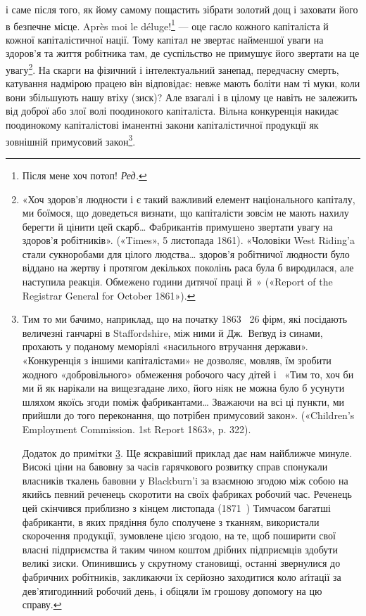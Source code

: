 і саме після того, як йому самому пощастить зібрати золотий
дощ і заховати його в безпечне місце. Après moi le déluge!\footnote*{
Після мене хоч потоп! \emph{Ред.}
} —
оце гасло кожного капіталіста й кожної капіталістичної нації.
Тому капітал не звертає найменшої уваги на здоров’я та життя
робітника там, де суспільство не примушує його звертати на це
увагу\footnote{
«Хоч здоров'я людности і є такий важливий елемент національного
капіталу, ми боїмося, що доведеться визнати, що капіталісти зовсім
не мають нахилу берегти й цінити цей скарб\dots{} Фабрикантів примушено
звертати увагу на здоров'я робітників». («Times», 5 листопада 1861).
«Чоловіки West Riding’a стали сукноробами для цілого людства\dots{} здоров’я
робітничої людности було віддано на жертву і протягом декількох
поколінь раса була б виродилася, але наступила реакція. Обмежено
години дитячої праці й~» («Report of the Registrar General for October
1861»).
}. На скарги на фізичний і інтелектуальний занепад,
передчасну смерть, катування надмірою працею він відповідає:
невже мають боліти нам ті муки, коли вони збільшують нашу
втіху (зиск)? Але взагалі і в цілому це навіть не залежить від
доброї або злої волі поодинокого капіталіста. Вільна конкуренція
накидає поодинокому капіталістові іманентні закони капіталістичної
продукції як зовнішній примусовий закон\footnote{
\label{footnote-114}Тим то ми бачимо, наприклад, що на початку 1863~ 26 фірм,
які посідають величезні ганчарні в Staffordshire, між ними й Дж.~Веґвуд
із синами, прохають у поданому меморіялі «насильного втручання держави».
«Конкуренція з іншими капіталістами» не дозволяє, мовляв, їм
зробити жодного «добровільного» обмеження робочого часу дітей і~
«Тим то, хоч би ми й як нарікали на вищезгадане лихо, його ніяк не можна
було б усунути шляхом якоїсь згоди поміж фабрикантами\dots{} Зважаючи на
всі ці пункти, ми прийшли до того переконання, що потрібен примусовий
закон». («Children’s Employment Commission. 1st Report 1863»,
p. 322).

Додаток до примітки \ref{footnote-114}. Ще яскравіший приклад дає нам найближче
минуле. Високі ціни на бавовну за часів гарячкового розвитку справ спонукали
власників ткалень бавовни у Blackburn’i за взаємною згодою між
собою на якийсь певний реченець скоротити на своїх фабриках робочий
час. Реченець цей скінчився приблизно з кінцем листопада (1871~)
Тимчасом багатші фабриканти, в яких прядіння було сполучене з тканням,
використали скорочення продукції, зумовлене цією згодою, на те, щоб
поширити свої власні підприємства й таким чином коштом дрібних підприємців
здобути великі зиски. Опинившись у скрутному становищі,
останні звернулися до фабричних робітників, закликаючи їх серйозно
заходитися коло аґітації за дев’ятигодинний робочий день, і обіцяли їм
грошову допомогу на цю справу.
}.

